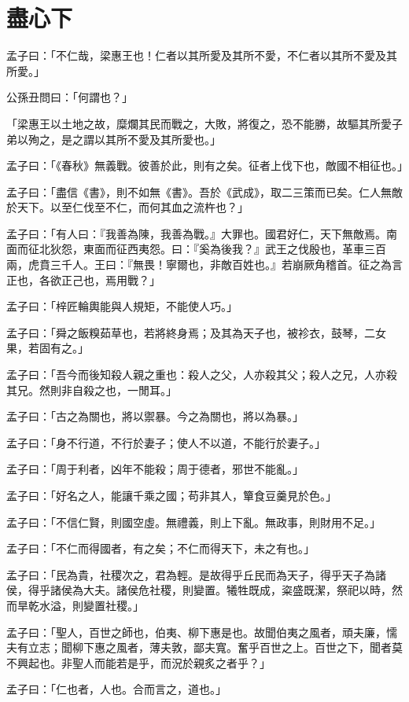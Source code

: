 \documentclass[12pt,a4paper]{ctexbook}
\begin{document}
\section{盡心下}
孟子曰：「不仁哉，梁惠王也！仁者以其所愛及其所不愛，不仁者以其所不愛及其所愛。」\par
公孫丑問曰：「何謂也？」\par
「梁惠王以土地之故，糜爛其民而戰之，大敗，將復之，恐不能勝，故驅其所愛子弟以殉之，是之謂以其所不愛及其所愛也。」\par
孟子曰：「《春秋》無義戰。彼善於此，則有之矣。征者上伐下也，敵國不相征也。」\par
孟子曰：「盡信《書》，則不如無《書》。吾於《武成》，取二三策而已矣。仁人無敵於天下。以至仁伐至不仁，而何其血之流杵也？」\par
孟子曰：「有人曰：『我善為陳，我善為戰。』大罪也。國君好仁，天下無敵焉。南面而征北狄怨，東面而征西夷怨。曰：『奚為後我？』武王之伐殷也，革車三百兩，虎賁三千人。王曰：『無畏！寧爾也，非敵百姓也。』若崩厥角稽首。征之為言正也，各欲正己也，焉用戰？」\par
孟子曰：「梓匠輪輿能與人規矩，不能使人巧。」\par
孟子曰：「舜之飯糗茹草也，若將終身焉；及其為天子也，被袗衣，鼓琴，二女果，若固有之。」\par
孟子曰：「吾今而後知殺人親之重也：殺人之父，人亦殺其父；殺人之兄，人亦殺其兄。然則非自殺之也，一閒耳。」\par
孟子曰：「古之為關也，將以禦暴。今之為關也，將以為暴。」\par
孟子曰：「身不行道，不行於妻子；使人不以道，不能行於妻子。」\par
孟子曰：「周于利者，凶年不能殺；周于德者，邪世不能亂。」\par
孟子曰：「好名之人，能讓千乘之國；苟非其人，簞食豆羹見於色。」\par
孟子曰：「不信仁賢，則國空虛。無禮義，則上下亂。無政事，則財用不足。」\par
孟子曰：「不仁而得國者，有之矣；不仁而得天下，未之有也。」\par
孟子曰：「民為貴，社稷次之，君為輕。是故得乎丘民而為天子，得乎天子為諸侯，得乎諸侯為大夫。諸侯危社稷，則變置。犧牲既成，粢盛既潔，祭祀以時，然而旱乾水溢，則變置社稷。」\par
孟子曰：「聖人，百世之師也，伯夷、柳下惠是也。故聞伯夷之風者，頑夫廉，懦夫有立志；聞柳下惠之風者，薄夫敦，鄙夫寬。奮乎百世之上。百世之下，聞者莫不興起也。非聖人而能若是乎，而況於親炙之者乎？」\par
孟子曰：「仁也者，人也。合而言之，道也。」\par
\end{document}
